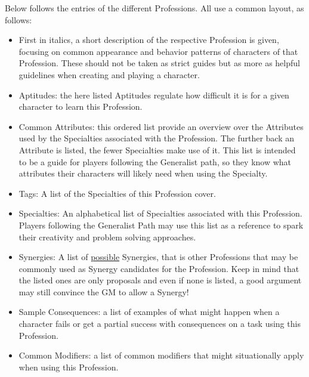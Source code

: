 Below follows the entries of the different Professions. 
All use a common layout, as follows:
\begin{itemize}
	\item First in italics, a short description of the respective Profession is given, focusing on common appearance and behavior patterns of characters of that Profession.
	These should not be taken as strict guides but as more as helpful guidelines when creating and playing a character.
	\item Aptitudes: the here listed Aptitudes regulate how difficult it is for a given character to learn this Profession.
	\item Common Attributes: this ordered list provide an overview over the Attributes used by the Specialties associated with the Profession. 
	The further back an Attribute is listed, the fewer Specialties make use of it.
	This list is intended to be a guide for players following the Generalist path, so they know what attributes their characters will likely need when using the Specialty.
	\item Tags: A list of  the Specialties of this Profession cover.
	\item Specialties: An alphabetical list of Specialties associated with this Profession.
	Players following the Generalist Path may use this list as a reference to spark their creativity and problem solving approaches.
	\item Synergies: A list of \underline{possible} Synergies, that is other Professions that may be commonly used as Synergy candidates for the Profession. Keep in mind that the listed ones are only proposals and even if none is listed, a good argument may still convince the GM to allow a Synergy!
	\item Sample Consequences: a list of examples of what might happen when a character fails or get a partial success with consequences on a task using this Profession.
	\item Common Modifiers: a list of common modifiers that might situationally apply when using this Profession.
\end{itemize}

